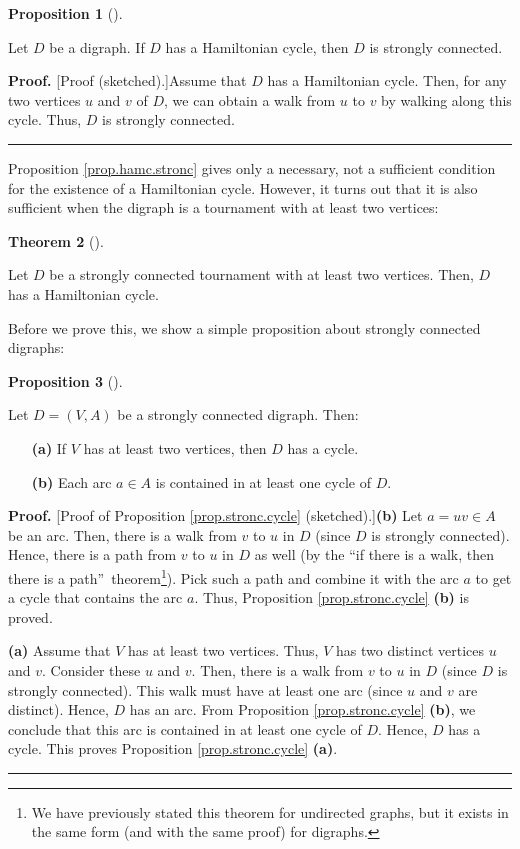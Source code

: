 \documentclass[numbers=enddot,12pt,final,onecolumn,notitlepage]{scrartcl}%
\numberwithin{exer}{subsection}
\theoremstyle{definition}
\newtheorem{theo}{Theorem}[subsection]
\newenvironment{theorem}[1][]
{\begin{theo}[#1]\begin{leftbar}}
{\end{leftbar}\end{theo}}
\newtheorem{prop}[theo]{Proposition}
\newenvironment{proposition}[1][]
{\begin{prop}[#1]\begin{leftbar}}
{\end{leftbar}\end{prop}}
\newenvironment{proof}[1][Proof]{\noindent\textbf{#1.} }{\ \rule{0.5em}{0.5em}}
\begin{document}
\begin{proposition}
\label{prop.hamc.stronc}Let $D$ be a digraph. If $D$ has a Hamiltonian cycle,
then $D$ is strongly connected.
\end{proposition}

\begin{proof}
[Proof (sketched).]Assume that $D$ has a Hamiltonian cycle. Then, for any two
vertices $u$ and $v$ of $D$, we can obtain a walk from $u$ to $v$ by walking
along this cycle. Thus, $D$ is strongly connected.
\end{proof}

Proposition \ref{prop.hamc.stronc} gives only a necessary, not a sufficient
condition for the existence of a Hamiltonian cycle. However, it turns out that
it is also sufficient when the digraph is a tournament with at least two vertices:

\begin{theorem}
\label{thm.hamc.camion}Let $D$ be a strongly connected tournament with at
least two vertices. Then, $D$ has a Hamiltonian cycle.
\end{theorem}

Before we prove this, we show a simple proposition about strongly connected digraphs:

\begin{proposition}
\label{prop.stronc.cycle}Let $D=\left(  V,A\right)  $ be a strongly connected
digraph. Then:

\begin{enumerate}
\item[\textbf{(a)}] If $V$ has at least two vertices, then $D$ has a cycle.

\item[\textbf{(b)}] Each arc $a\in A$ is contained in at least one cycle of
$D$.
\end{enumerate}
\end{proposition}

\begin{proof}
[Proof of Proposition \ref{prop.stronc.cycle} (sketched).]\textbf{(b)} Let
$a=uv\in A$ be an arc. Then, there is a walk from $v$ to $u$ in $D$ (since $D$
is strongly connected). Hence, there is a path from $v$ to $u$ in $D$ as well
(by the \textquotedblleft if there is a walk, then there is a
path\textquotedblright\ theorem\footnote{We have previously stated this
theorem for undirected graphs, but it exists in the same form (and with the
same proof) for digraphs.}). Pick such a path and combine it with the arc $a$
to get a cycle that contains the arc $a$. Thus, Proposition
\ref{prop.stronc.cycle} \textbf{(b)} is proved. \medskip

\textbf{(a)} Assume that $V$ has at least two vertices. Thus, $V$ has two
distinct vertices $u$ and $v$. Consider these $u$ and $v$. Then, there is a
walk from $v$ to $u$ in $D$ (since $D$ is strongly connected). This walk must
have at least one arc (since $u$ and $v$ are distinct). Hence, $D$ has an arc.
From Proposition \ref{prop.stronc.cycle} \textbf{(b)}, we conclude that this
arc is contained in at least one cycle of $D$. Hence, $D$ has a cycle. This
proves Proposition \ref{prop.stronc.cycle} \textbf{(a)}.
\end{proof}
\end{document}
